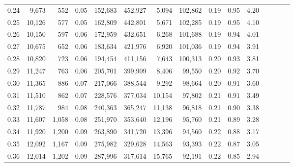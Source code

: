 \begin{tabular}{rrrcrrrrrrrrrrr}
0.24 &   9,673 &    552 &                                       0.05 &  152,683 &  452,927 &    5,094 &  102,862 &  0.19 &  0.95 &                         4.20 \\
0.25 &  10,126 &    577 &                                       0.05 &  162,809 &  442,801 &    5,671 &  102,285 &  0.19 &  0.95 &                         4.10 \\
0.26 &  10,150 &    597 &                                       0.06 &  172,959 &  432,651 &    6,268 &  101,688 &  0.19 &  0.94 &                         4.01 \\
0.27 &  10,675 &    652 &                                       0.06 &  183,634 &  421,976 &    6,920 &  101,036 &  0.19 &  0.94 &                         3.91 \\
0.28 &  10,820 &    723 &                                       0.06 &  194,454 &  411,156 &    7,643 &  100,313 &  0.20 &  0.93 &                         3.81 \\
0.29 &  11,247 &    763 &                                       0.06 &  205,701 &  399,909 &    8,406 &   99,550 &  0.20 &  0.92 &                         3.70 \\
0.30 &  11,365 &    886 &                                       0.07 &  217,066 &  388,544 &    9,292 &   98,664 &  0.20 &  0.91 &                         3.60 \\
0.31 &  11,510 &    862 &                                       0.07 &  228,576 &  377,034 &   10,154 &   97,802 &  0.21 &  0.91 &                         3.49 \\
0.32 &  11,787 &    984 &                                       0.08 &  240,363 &  365,247 &   11,138 &   96,818 &  0.21 &  0.90 &                         3.38 \\
0.33 &  11,607 &  1,058 &                                       0.08 &  251,970 &  353,640 &   12,196 &   95,760 &  0.21 &  0.89 &                         3.28 \\
0.34 &  11,920 &  1,200 &                                       0.09 &  263,890 &  341,720 &   13,396 &   94,560 &  0.22 &  0.88 &                         3.17 \\
0.35 &  12,092 &  1,167 &                                       0.09 &  275,982 &  329,628 &   14,563 &   93,393 &  0.22 &  0.87 &                         3.05 \\
0.36 &  12,014 &  1,202 &                                       0.09 &  287,996 &  317,614 &   15,765 &   92,191 &  0.22 &  0.85 &                         2.94 \\

\end{tabular}
